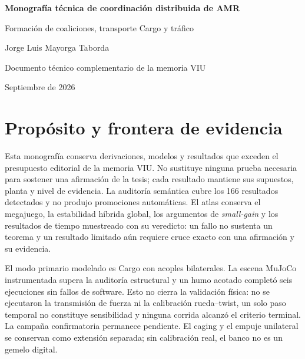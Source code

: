 \documentclass[12pt,a4paper]{article}
\begin{document}
\hypersetup{pageanchor=false}
\begin{titlepage}
  \centering
  \vspace*{2.2cm}
  {\Large\bfseries Monografía técnica de coordinación distribuida de AMR\par}
  \vspace{0.8cm}
  {\large Formación de coaliciones, transporte Cargo y tráfico\par}
  \vfill
  {\large Jorge Luis Mayorga Taborda\par}
  \vspace{0.3cm}
  {\normalsize Documento técnico complementario de la memoria VIU\par}
  \vspace{1.4cm}
  {\normalsize Septiembre de 2026\par}
\end{titlepage}

\hypersetup{pageanchor=true}
\tableofcontents
\clearpage
{}

\section{Propósito y frontera de evidencia}

Esta monografía conserva derivaciones, modelos y resultados que exceden el presupuesto editorial de la memoria VIU. No sustituye ninguna prueba necesaria para sostener una afirmación de la tesis; cada resultado mantiene sus supuestos, planta y nivel de evidencia. La auditoría semántica cubre los 166 resultados detectados y no produjo promociones automáticas. El atlas conserva el megajuego, la estabilidad híbrida global, los argumentos de \emph{small-gain} y los resultados de tiempo muestreado con su veredicto: un fallo no sustenta un teorema y un resultado limitado aún requiere cruce exacto con una afirmación y su evidencia.

El modo primario modelado es Cargo con acoples bilaterales. La escena MuJoCo
instrumentada supera la auditoría estructural y un humo acotado completó seis
ejecuciones sin fallos de software. Esto no cierra la validación física: no se
ejecutaron la transmisión de fuerza ni la calibración rueda--twist, un solo paso
temporal no constituye sensibilidad y ninguna corrida alcanzó el criterio
terminal. La campaña confirmatoria permanece pendiente. El caging y el empuje
unilateral se conservan como extensión separada; sin calibración real, el banco
no es un gemelo digital.
\end{document}

